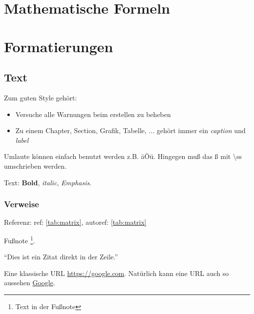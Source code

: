 \documentclass[
	12pt %
	,a4paper %
	,headings=normal %
	,toc=graduated %
]{scrreprt} %
\begin{document}
\blinddocument

\chapter{Mathematische Formeln}\label{cha:mathematischeFormeln}

\blindmathpaper

\chapter{Formatierungen}\label{cha:formatierungen}

\blindtext

\section{Text}\label{sec:text}

Zum guten Style gehört:
\begin{itemize}
	\item Versuche alle Warnungen beim erstellen zu beheben
	\item Zu einem Chapter, Section, Grafik, Tabelle, ... gehört immer ein \textit{caption} und \textit{label}
\end{itemize}

Umlaute können einfach benutzt werden z.B. äÖü. Hingegen mu{\ss} das {\ss} mit \textbackslash ss umschrieben werden.\par

Text: \textbf{Bold}, \textit{italic}, \emph{Emphasis}.\par

\subsection{Verweise}\label{ssec:verweise}

Referenz: ref: \ref{tab:matrix}, autoref: \autoref{tab:matrix}\par

Fußnote \footnote{Text in der Fußnote}.\par

\enquote{Dies ist ein Zitat direkt in der Zeile.}\par

Eine klassische URL \url{https://google.com}. %
Natürlich kann eine URL auch so aussehen \href{https://google.com}{Google}.\par
\end{document}
